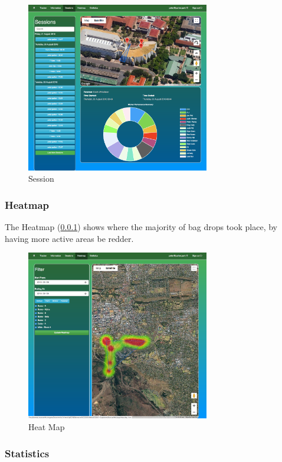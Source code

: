 \documentclass[11pt]{article}
\begin{document}
\begin{figure}
 \centering
 \includegraphics[width=8cm, keepaspectratio]{Images/UsingSystem/WebSession.png}
 \caption{Session}
 \label{webSession}
\end{figure}

\subsubsection{Heatmap}
\label{webHeatmap}

The Heatmap (\ref{webHeatmap}) shows where the majority of bag drops took place, by having more active areas be redder.

\begin{figure}
 \centering
 \includegraphics[width=8cm, keepaspectratio]{Images/UsingSystem/WebHeatmap.png}
 \caption{Heat Map}
 \label{HeatMap}
\end{figure}

\subsubsection{Statistics}
\label{webStatistics}
\end{document}
